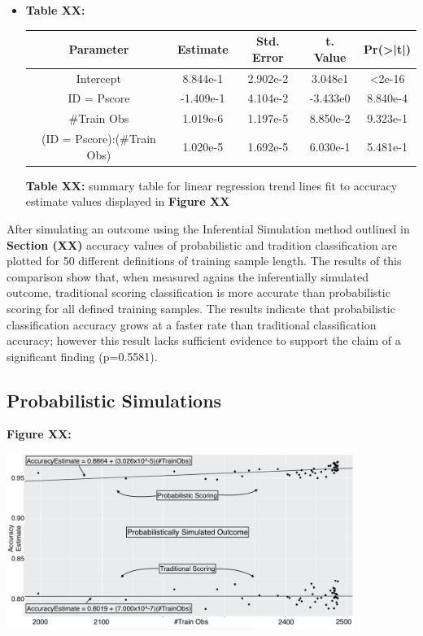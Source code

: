 \documentclass[12pt,]{article}
\providecommand{\tightlist}{%
  \setlength{\itemsep}{0pt}\setlength{\parskip}{0pt}}
\begin{document}
\begin{itemize}
\tightlist
\item
  \textbf{Table XX:}

  \begin{center}
  \begin{tabular}{|c|c|c|c|c|}
  \hline
  Parameter                      & Estimate  & Std. Error & t. Value  & Pr(>|t|) \\
  \hline
  \hline
  Intercept                      &  8.844e-1 &  2.902e-2  &  3.048e1  & <2e-16   \\                             
  \hline
  ID = Pscore                    & -1.409e-1 &  4.104e-2  & -3.433e0  & 8.840e-4 \\
  \hline
  \#Train Obs                    &  1.019e-6 &  1.197e-5  &  8.850e-2 & 9.323e-1 \\
  \hline
  (ID = Pscore):(\#Train Obs) &  1.020e-5 &  1.692e-5  &  6.030e-1 & 5.481e-1 \\
  \hline
  \end{tabular}
  \end{center}

  \textbf{Table XX:} summary table for linear regression trend lines fit
  to accuracy estimate values displayed in \textbf{Figure XX}
\end{itemize}

After simulating an outcome using the Inferential Simulation method
outlined in \textbf{Section (XX)} accuracy values of probabilistic and
tradition classification are plotted for 50 different definitions of
training sample length. The results of this comparison show that, when
measured agains the inferentially simulated outcome, traditional scoring
classification is more accurate than probabilistic scoring for all
defined training samples. The results indicate that probabilistic
classification accuracy grows at a faster rate than traditional
classification accuracy; however this result lacks sufficient evidence
to support the claim of a significant finding (p=0.5581).

\hypertarget{probabilistic-simulations}{%
\subsection{Probabilistic Simulations}\label{probabilistic-simulations}}

\textbf{Figure XX:}

\begin{center}
\includegraphics[width=0.85\textwidth]{Sup2Graph.jpg}
\end{center}
\end{document}

